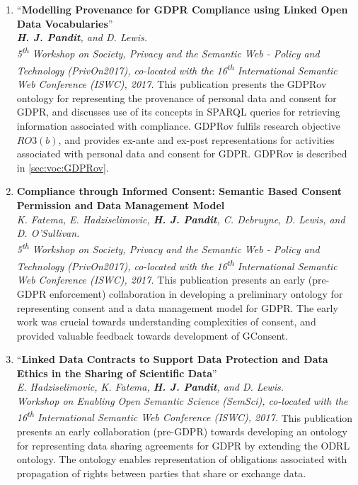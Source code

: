 \begin{enumerate}[start]
    \item ``\textbf{Modelling Provenance for GDPR Compliance using Linked Open Data Vocabularies}'' \cite{pandit_modelling_2017} \\ 
    \textit{\textbf{H. J. Pandit}, and D. Lewis.} \\
    \textit{5\textsuperscript{th} Workshop on Society, Privacy and the Semantic Web - Policy and Technology (PrivOn2017), co-located with the 16\textsuperscript{th} International Semantic Web Conference (ISWC), 2017. }
        \vspace{0.1cm} \newline
        This publication presents the GDPRov ontology for representing the provenance of personal data and consent for GDPR, and discusses use of its concepts in SPARQL queries for retrieving information associated with compliance. GDPRov fulfils research objective $RO3(b)$, and provides ex-ante and ex-post representations for activities associated with personal data and consent for GDPR. GDPRov is described in \autoref{sec:voc:GDPRov}.
    \item \textbf{Compliance through Informed Consent: Semantic Based Consent Permission and Data Management Model} \cite{fatema_compliance_2017} \\
    \textit{K. Fatema, E. Hadziselimovic, \textbf{H. J. Pandit}, C. Debruyne, D. Lewis, and D. O’Sullivan.} \\
    \textit{5\textsuperscript{th} Workshop on Society, Privacy and the Semantic Web - Policy and Technology (PrivOn2017), co-located with the 16\textsuperscript{th} International Semantic Web Conference (ISWC), 2017. }
        \vspace{0.1cm} \newline
        This publication presents an early (pre-GDPR enforcement) collaboration in developing a preliminary ontology for representing consent and a data management model for GDPR. The early work was crucial towards understanding complexities of consent, and provided valuable feedback towards development of GConsent.
    \item ``\textbf{Linked Data Contracts to Support Data Protection and Data Ethics in the Sharing of Scientific Data}'' \cite{hadziselimovic_linked_2017} \\ 
    \textit{E. Hadziselimovic, K. Fatema, \textbf{H. J. Pandit}, and D. Lewis.} \\ 
    \textit{Workshop on Enabling Open Semantic Science (SemSci), co-located with the 16\textsuperscript{th} International Semantic Web Conference (ISWC), 2017.}
        \vspace{0.1cm} \newline
        This publication presents an early collaboration (pre-GDPR) towards developing an ontology for representing data sharing agreements for GDPR by extending the ODRL ontology. The ontology enables representation of obligations associated with propagation of rights between parties that share or exchange data.
\end{enumerate}

